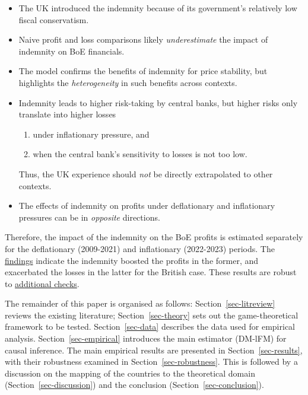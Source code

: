 \documentclass[
  a4paper,
  abstract=true]{scrartcl}
\theoremstyle{definition}
\begin{document}
\begin{itemize}
\item
  The UK introduced the indemnity because of its government's relatively
  low fiscal conservatism.
\item
  Naive profit and loss comparisons likely \emph{underestimate} the
  impact of indemnity on BoE financials.
\item
  The model confirms the benefits of indemnity for price stability, but
  highlights the \emph{heterogeneity} in such benefits across contexts.
\item
  Indemnity leads to higher risk-taking by central banks, but higher
  risks only translate into higher losses

  \begin{enumerate}
  \def\labelenumi{\arabic{enumi}.}
  \item
    under inflationary pressure, and
  \item
    when the central bank's sensitivity to losses is not too low.
  \end{enumerate}

  Thus, the UK experience should \emph{not} be directly extrapolated to
  other contexts.
\item
  The effects of indemnity on profits under deflationary and
  inflationary pressures can be in \emph{opposite} directions.
\end{itemize}

Therefore, the impact of the indemnity on the BoE profits is estimated
separately for the deflationary (2009-2021) and inflationary (2022-2023)
periods. The \hyperref[sec-results]{findings} indicate the indemnity
boosted the profits in the former, and exacerbated the losses in the
latter for the British case. These results are robust to
\hyperref[sec-robustness]{additional checks}.

The remainder of this paper is organised as follows:
Section~\ref{sec-litreview} reviews the existing literature;
Section~\ref{sec-theory} sets out the game-theoretical framework to be
tested. Section~\ref{sec-data} describes the data used for empirical
analysis. Section~\ref{sec-empirical} introduces the main estimator
(DM-lFM) for causal inference. The main empirical results are presented
in Section~\ref{sec-results}, with their robustness examined in
Section~\ref{sec-robustness}. This is followed by a discussion on the
mapping of the countries to the theoretical domain
(Section~\ref{sec-discussion}) and the conclusion
(Section~\ref{sec-conclusion}).
\end{document}

